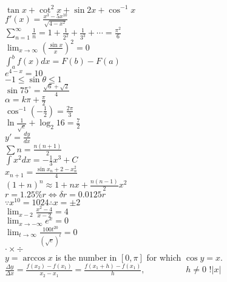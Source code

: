 \documentclass{article}
\newcommand{\ds}{\displaystyle}
\begin{document}
$\tan x+\cot^2 x+\sin 2x+\cos^{-1}x$\\
$\displaystyle f'(x)=\frac{x^3-5x^{10}}{\sqrt{4-x^2}}$\\
$\ds\sum^{\infty}_{n=1}\frac{1}{n}=1+\frac{1}{2^2}+\frac{1}{3^3}+\cdots=\frac{\pi^2}{6}$\\
$\ds\lim_{x\rightarrow\infty}(\frac{\sin x}{x})^2=0$\\
$\ds\int^{b}_{a}f(x)dx=F(b)-F(a)$\\
$e^{4-x}=10$\\
$-1\le\sin\theta\le1$\\
$\ds\sin 75^\circ=\frac{\sqrt{6}+\sqrt{2}}{4}$\\
$\ds\alpha=k\pi+\frac{\pi}{2}$\\
$\ds\cos^{-1}(-\frac{1}{2})=\frac{2\pi}{3}$\\
$\ds\ln\frac{1}{\sqrt{e}}+\log_2{16}=\frac{7}{2}$\\
$y'=\frac{dy}{dx}$\\
$\ds\sum n=\frac{n(n+1)}{2}$\\
$\ds\int x^2 dx=-\frac{1}{3}x^3+C$\\
$\ds x_{n+1}=\frac{\sin x_{n}+2-x^{2}_{n}}{4}$\\
$\ds(1+n)^{n}\approx1+nx+\frac{n(n-1)}{2}x^2$\\
$r=1.25\% r\Leftrightarrow \delta r=0.0125r$\\
$\because x^{10}=1024 \therefore x=\pm 2$\\
$\ds\lim_{x-2}\frac{x^2-4}{x-2}=4$\\
$\ds\lim_{x\rightarrow -\infty}e^{x}=0$\\
$\ds\lim_{t\rightarrow \infty}\frac{100t^{20}}{(\sqrt{e})^t}=0$\\
$\cdot\times\div$\\
$y=\arccos x$ is the number in $[0,\pi]$ for which $\cos y=x.$\\
$\ds\frac{\Delta y}{\Delta x}=\frac{f(x_2)-f(x_1)}{x_{2}-x_{1}}=\frac{f(x_1+h)-f(x_1)}{h},\hspace{2cm} h\ne0$
$!|x|$
\end{document}
